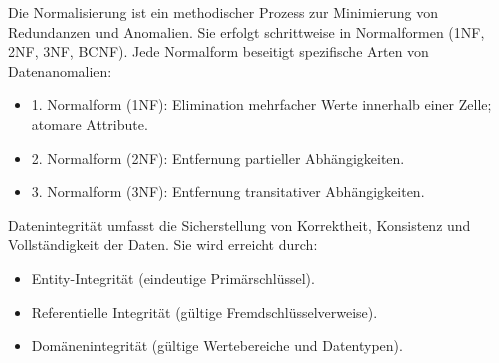 Die Normalisierung ist ein methodischer Prozess zur Minimierung von Redundanzen und Anomalien. Sie erfolgt schrittweise in Normalformen (1NF, 2NF, 3NF, BCNF). Jede Normalform beseitigt spezifische Arten von Datenanomalien:

\begin{itemize}

\item
1. Normalform (1NF): Elimination mehrfacher Werte innerhalb einer Zelle; atomare Attribute.
\item
2. Normalform (2NF): Entfernung partieller Abhängigkeiten.
\item
3. Normalform (3NF): Entfernung transitativer Abhängigkeiten.
\end{itemize}

Datenintegrität umfasst die Sicherstellung von Korrektheit, Konsistenz und Vollständigkeit der Daten. Sie wird erreicht durch:

\begin{itemize}
\item
Entity-Integrität (eindeutige Primärschlüssel).
\item
Referentielle Integrität (gültige Fremdschlüsselverweise).

\item
Domänenintegrität (gültige Wertebereiche und Datentypen).
\end{itemize}
